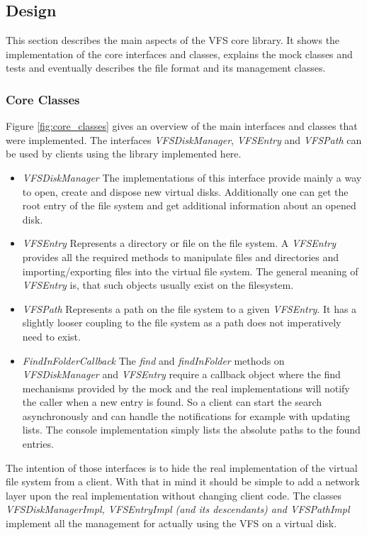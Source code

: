 \subsection{Design}
This section describes the main aspects of the VFS core library. It shows the
implementation of the core interfaces and classes, explains the mock classes and
tests and eventually describes the file format and its management classes.

\subsubsection{Core Classes}\label{sec:coreClasses}
Figure \ref{fig:core_classes} gives an overview of the main interfaces and
classes that were implemented. The interfaces \textit{VFSDiskManager},
\textit{VFSEntry} and \textit{VFSPath} can be used by clients using the library
implemented here.
\begin{itemize}
\item{\textit{VFSDiskManager}} The implementations of this interface provide
mainly a way to open, create and dispose new virtual disks. Additionally one can
get the root entry of the file system and get additional information about an
opened disk.
\item{\textit{VFSEntry}} Represents a directory or file on the file system. A
\textit{VFSEntry} provides all the required methods to manipulate files and
directories and importing/exporting files into the virtual file system. The
general meaning of \textit{VFSEntry} is, that such objects usually exist on the
filesystem.
\item {\textit{VFSPath}} Represents a path on the file system to a given
\textit{VFSEntry}. It has a slightly looser coupling to the file system as a
path does not imperatively need to exist.
\item {\textit{FindInFolderCallback}} The \textit{find} and
\textit{findInFolder} methods on \textit{VFSDiskManager} and \textit{VFSEntry}
require a callback object where the find mechanisms provided by the mock and the
real implementations will notify the caller when a new entry is found. So a
client can start the search asynchronously and can handle the notifications for
example with updating lists. The console implementation simply lists the
absolute paths to the found entries.
\end{itemize}

The intention of those interfaces is to hide the real implementation of the
virtual file system from a client. With that in mind it should be simple to add
a network layer upon the real implementation without changing client code. The
classes \textit{VFSDiskManagerImpl, VFSEntryImpl (and its descendants) and
VFSPathImpl} implement all the management for actually using the VFS on a virtual disk.

